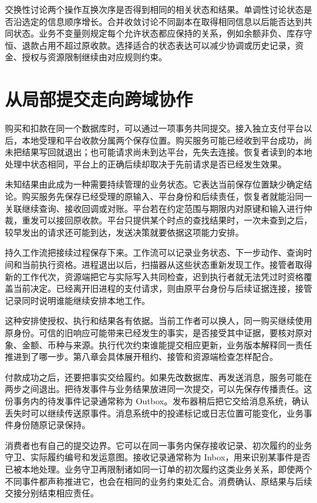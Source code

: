 交换性讨论两个操作互换次序是否得到相同的相关状态和结果。单调性讨论状态是否沿选定的信息顺序增长。合并收敛讨论不同副本在取得相同信息以后能否达到共同状态。业务不变量则规定每个允许状态都应保持的关系，例如余额非负、库存守恒、退款占用不超过原收款。选择适合的状态表达可以减少协调或历史记录，资金、授权与资源限制继续由对应规则约束。

\section*{从局部提交走向跨域协作}

购买和扣款在同一个数据库时，可以通过一项事务共同提交。接入独立支付平台以后，本地受理和平台收款分属两个保存位置。购买服务可能已经收到平台成功，尚未把结果写回就退出；也可能请求尚未到达平台，先失去连接。恢复者读到的本地处理中状态相同，平台上的正确后续却取决于先前请求是否已经发生效果。

未知结果由此成为一种需要持续管理的业务状态。它表达当前保存位置缺少确定结论。购买服务先保存已经受理的原输入、平台身份和后续责任，恢复者就能沿同一关联继续查询、接收回调或对账。平台若在约定范围与期限内对原键和输入进行仲裁，重发可以接回原收款。平台只提供某个时点的查找结果时，一次未查到之后，较早发出的请求还可能到达，发送决策就要依据这项能力安排。

持久工作流把接续过程保存下来。工作流可以记录业务状态、下一步动作、查询时间和当前执行资格。进程退出以后，扫描器从这些状态重新发现工作。接管者取得新的工作代次，资源端把它与实际写入共同检查，迟到执行者就无法凭过时资格覆盖当前决定。已经离开旧进程的支付请求，则由原平台身份与后续证据连接，接管记录同时说明谁能继续安排本地工作。

这种安排使授权、执行和结果各有依据。当前工作者可以换人，同一购买继续使用原身份。可信的旧响应可能带来已经发生的事实，是否接受其中证据，要核对原对象、金额、币种与来源。执行代次约束谁能提交相应更新，业务版本解释同一责任推进到了哪一步。第八章会具体展开租约、接管和资源端检查怎样配合。

付款成功之后，还要把事实交给履约。如果先改数据库、再发送消息，服务可能在两步之间退出。把待发事件与业务结果放进同一次提交，可以先保存传播责任。这份事务内的待发事件记录通常称为 Outbox。发布器稍后把它交给消息系统，确认丢失时可以继续传送原事件。消息系统中的投递标记或日志位置可能变化，业务事件身份随原记录保持。

消费者也有自己的提交边界。它可以在同一事务内保存接收记录、初次履约的业务守卫、实际履约编号和发运意图。接收记录通常称为 Inbox，用来识别某事件是否已被本地处理。业务守卫再限制诸如同一订单的初次履约这类业务关系，即使两个不同事件都声称推进它，也会在相同的业务约束处汇合。消费确认、原结果与后续交接分别结束相应责任。

